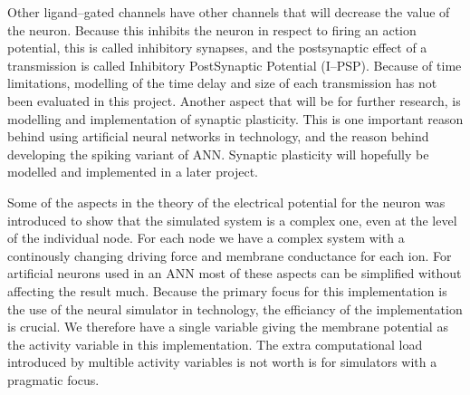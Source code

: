 Other ligand--gated channels have other channels that will decrease the value of the neuron.
Because this inhibits the neuron in respect to firing an action potential, this is called inhibitory synapses, and the postsynaptic effect of a transmission is called Inhibitory PostSynaptic Potential (I--PSP).
Because of time limitations, modelling of the time delay and size of each transmission has not been evaluated in this project.
Another aspect that will be for further research, is modelling and implementation of synaptic plasticity. 
This is one important reason behind using artificial neural networks in technology, and the reason behind developing the spiking variant of ANN.
Synaptic plasticity will hopefully be modelled and implemented in a later project.





Some of the aspects in the theory of the electrical potential for the neuron was introduced to show that the simulated system is a complex one, even at the level of the individual node. %
For each node we have a complex system with a continously changing driving force and membrane conductance for each ion. 
For artificial neurons used in an ANN most of these aspects can be simplified without affecting the result much. 
Because the primary focus for this implementation is the use of the neural simulator in technology, the efficiancy of the implementation is crucial. 
We therefore have a single variable giving the membrane potential as the activity variable in this implementation. 
The extra computational load introduced by multible activity variables is not worth is for simulators with a pragmatic focus. %

